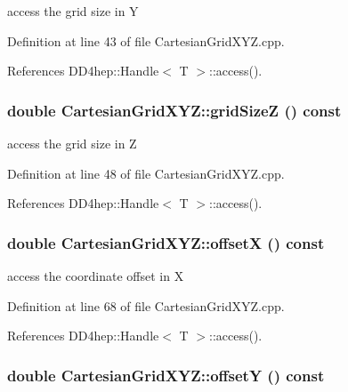 access the grid size in Y 

Definition at line 43 of file CartesianGridXYZ.cpp.

References DD4hep::Handle$<$ T $>$::access().\hypertarget{class_d_d4hep_1_1_geometry_1_1_cartesian_grid_x_y_z_a3110ef4e4523ec9572b30e39ba81af07}{
\subsubsection[{gridSizeZ}]{\setlength{\rightskip}{0pt plus 5cm}double CartesianGridXYZ::gridSizeZ () const}}
\label{class_d_d4hep_1_1_geometry_1_1_cartesian_grid_x_y_z_a3110ef4e4523ec9572b30e39ba81af07}


access the grid size in Z 

Definition at line 48 of file CartesianGridXYZ.cpp.

References DD4hep::Handle$<$ T $>$::access().\hypertarget{class_d_d4hep_1_1_geometry_1_1_cartesian_grid_x_y_z_a52efce9910232c17e8188ad32196d3e6}{
\subsubsection[{offsetX}]{\setlength{\rightskip}{0pt plus 5cm}double CartesianGridXYZ::offsetX () const}}
\label{class_d_d4hep_1_1_geometry_1_1_cartesian_grid_x_y_z_a52efce9910232c17e8188ad32196d3e6}


access the coordinate offset in X 

Definition at line 68 of file CartesianGridXYZ.cpp.

References DD4hep::Handle$<$ T $>$::access().\hypertarget{class_d_d4hep_1_1_geometry_1_1_cartesian_grid_x_y_z_ae2fbfd0517ed5b6eedbd65cbf504bec9}{
\subsubsection[{offsetY}]{\setlength{\rightskip}{0pt plus 5cm}double CartesianGridXYZ::offsetY () const}}
\label{class_d_d4hep_1_1_geometry_1_1_cartesian_grid_x_y_z_ae2fbfd0517ed5b6eedbd65cbf504bec9}


